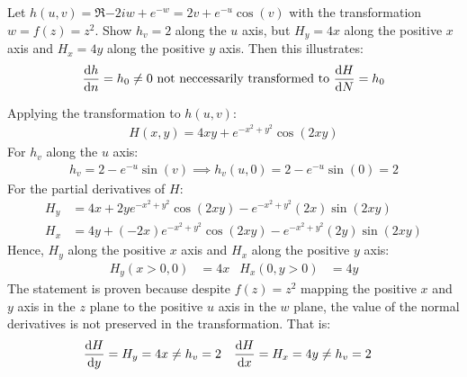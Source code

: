 \documentclass[12pt, english]{book}
\makeatletter
\renewenvironment{proof}[1][\proofname]{\par
	\pushQED{\qed}%
	\normalfont \topsep6\p@\@plus6\p@\relax
	\list{}{%
		\settowidth{\leftmargin}{\itshape\proofname:\hskip\labelsep}%
		\setlength{\labelwidth}{0pt}%
		\setlength{\itemindent}{-\leftmargin}%
		}%
	\item[\hskip\labelsep\itshape#1\@addpunct{:}]\ignorespaces
	}{\popQED\endlist\@endpefalse}
\makeatother
\begin{document}
	\begin{example}
		Let \(h(u,v) = \Re{-2iw + e^{-w}} = 2v + e^{-u} \cos(v)\) with the transformation \(w = f(z) = z^2\). Show \(h_v = 2\) along the \(u\) axis, but \(H_y = 4x\) along the positive \(x\) axis and \(H_x = 4y\) along the positive \(y\) axis. Then this illustrates:
		\begin{align*}
			\dv{h}{n} = h_0 \neq 0 \text{ not neccessarily transformed to } 
			\dv{H}{N} = h_0
		\end{align*}
		\begin{proof}
			{\color{Grey}
			Applying the transformation to \(h(u,v)\):
			\begin{align*}
				H(x,y) =  4xy + e^{-x^2 + y^2} \cos(2xy)
			\end{align*}
			For \(h_v\) along the \(u\) axis:
			\begin{align*}
				h_v = 2 - e^{-u} \sin(v) \implies h_v(u, 0) = 2 - e^{-u} \sin(0) = 2
			\end{align*}
			For the partial derivatives of \(H\):
			\begin{align*}
				H_y &= 4x + 2y e^{-x^2 + y^2} \cos(2xy) - e^{-x^2 + y^2} (2x) \sin(2xy) \\
				H_x &= 4y + (-2x) e^{-x^2 + y^2} \cos(2xy) - e^{-x^2 + y^2} (2y) \sin(2xy)
			\end{align*}
			Hence, \(H_y\) along the positive \(x\) axis and \(H_x\) along the positive \(y\) axis:
			\begin{align*}
				H_y (x>0, 0) &= 4x &
				H_x (0, y>0) &= 4y
			\end{align*}
			The statement is proven because despite \(f(z) = z^2\) mapping the positive \(x\) and \(y\) axis in the \(z\) plane to the positive \(u\) axis in the \(w\) plane, the value of the normal derivatives is not preserved in the transformation. That is:
			\begin{align*}
				\dv{H}{y} = H_y = 4x &\neq h_v = 2 &
				\dv{H}{x} = H_x = 4y &\neq h_v = 2
			\end{align*}
			}
		\end{proof}
	\end{example}
\end{document}
